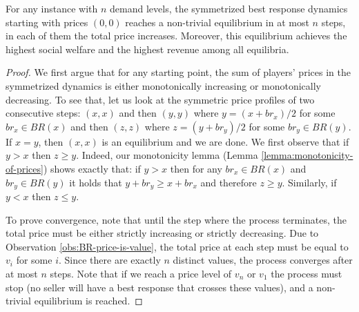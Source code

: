 \begin{proposition}\label{prop:sym-dynamics}
For any instance
with $n$ demand levels, the symmetrized best response dynamics starting with prices $(0,0)$ reaches a non-trivial equilibrium in at most $n$ steps, in each of them the total price increases.
Moreover, %
this equilibrium achieves the highest social welfare and the highest revenue among all equilibria.


\end{proposition}
\begin{proof}
We first argue that for any starting point, the sum of players' prices in the symmetrized dynamics is either monotonically increasing or monotonically decreasing.
To see that, let us look at the symmetric price profiles of two consecutive steps: $(x,x)$ and then $(y,y)$ where
	$y=(x+br_x)/2$ for some $br_x\in BR(x)$ and then $(z,z)$ where $z=(y + br_y)/2$ for some $br_y\in BR(y)$.
If $x=y$, then $(x,x)$ is an equilibrium and we are done. %
We first observe that if $y>x$ then $z \geq y$. %
Indeed, our monotonicity lemma (Lemma \ref{lemma:monotonicity-of-prices}) shows exactly that: if $y>x$ then
for any
$br_x\in BR(x)$ and  $br_y\in BR(y)$ it holds that
 $y+br_y \geq x+br_x$ and therefore $z\geq y$. Similarly, if $y<x$ then $z \leq y$.

To prove convergence, note that until the step where the process terminates,
the total price must be either strictly increasing or strictly decreasing. Due to Observation \ref{obs:BR-price-is-value}, the total price at each step must be equal to $v_i$ for some $i$. Since there are exactly $n$ distinct values, the process converges after at most $n$ steps.
Note that if we reach a price level of $v_n$ or $v_1$ the process must stop (no seller will have a best response that crosses these values), and a non-trivial equilibrium is reached.


%
%


\end{proof}

